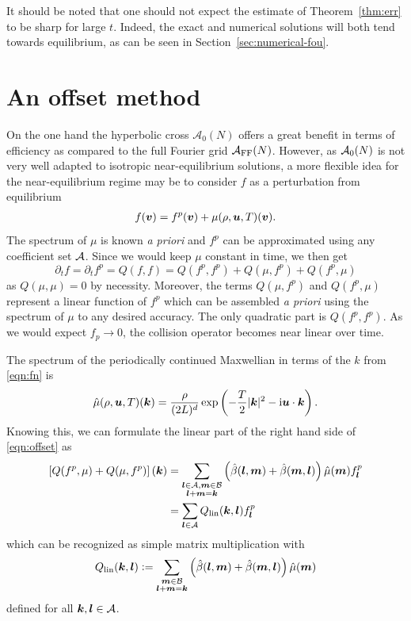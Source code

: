 It should be noted that one should not expect the estimate of
Theorem~\ref{thm:err} to be sharp for large $t$. Indeed, the exact and numerical
solutions will both tend towards equilibrium, as can be seen in
Section~\ref{sec:numerical-fou}.

\section{An offset method}
\label{sec:offs}

On the one hand the hyperbolic cross $\mathcal{A}_0(N)$
offers a great benefit in terms of efficiency as compared
to the full Fourier grid $\mathcal{A}_\text{FF}(N)$.
However, as $\mathcal{A}_0(N)$
is not very well adapted to
isotropic near-equilibrium solutions,
a more flexible idea for the 
near-equilibrium regime
may be to consider $f$ as a perturbation from equilibrium
\begin{gather}
  \label{eq:fp}
    f({\bm v}) = f^p({\bm v}) + \mu(\rho,{\bm u},T)({\bm v}).
\end{gather}
The spectrum of $\mu$ is known {\em a priori} and $f^p$ can be
approximated using any coefficient set $\mathcal{A}$. Since we would keep $\mu$
constant in time, we then get
\begin{equation} \label{eqn:offset}
    \partial_t f = \partial_t f^p = Q(f,f) = Q(f^p,f^p) + Q(\mu,f^p) + Q(f^p,\mu)
\end{equation}
as $Q(\mu,\mu)=0$ by necessity. Moreover, the terms
$Q(\mu,f^p)$ and $Q(f^p,\mu)$ represent a linear function of
$f^p$ which can be assembled {\em a priori} using the spectrum of $\mu$
to any desired accuracy. The only quadratic part is $Q(f^p,f^p)$. As we would
expect $f_p\to0$, the collision operator becomes near linear over time.

The spectrum of the periodically continued Maxwellian in terms of the $k$ from
\eqref{eqn:fn} is 
\begin{equation} \label{eqn:maxspec}
    \hat{\mu}(\rho,{\bm u},T)({\bm k}) = \frac{\rho}{(2L)^d}
            \exp\left(-\frac{T}{2}|{\bm k}|^2 - \mathrm{i}{\bm u}\cdot {\bm k}\right). \\
\end{equation}
Knowing this, we can formulate the linear part of the right hand side of
\eqref{eqn:offset} as 
\begin{align}
    \nonumber \left[Q(f^p,\mu)+Q(\mu,f^p)\right]({\bm k}) &=
        \sum_{\substack{{\bm l}\in\mathcal{A},{\bm m}\in\mathcal{B}\\{\bm l}+{\bm m}={\bm k}}}
        \left( \hat{\beta}({\bm l},{\bm m}) + \hat{\beta}({\bm m},{\bm l}) \right) \hat{\mu}({\bm m}) f^p_{\bm l} \\
    &= \sum_{{\bm l}\in\mathcal{A}} Q_\text{lin}({\bm k},{\bm l}) f^p_{\bm l} \label{eqn:Qmult}
\end{align}
which can be recognized as simple matrix multiplication with
\[
    Q_\text{lin}({\bm k},{\bm l}) \vcentcolon= \sum_{\substack{{\bm m}\in\mathcal{B}\\{\bm l}+{\bm m}={\bm k}}}
            \left(\hat{\beta}({\bm l},{\bm m})+\hat{\beta}({\bm m},{\bm l})\right)\hat{\mu}({\bm m})
\]
defined for all ${\bm k},{\bm l}\in\mathcal{A}$.

